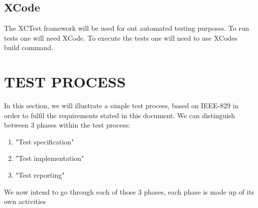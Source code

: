 \documentclass[12pt]{article}
\begin{document}
  \subsection{XCode}
  The XCTest framework will be used for out automated testing purposes. To run tests one will need XCode. To execute the tests one will need to use XCodes build command.
 \section{TEST PROCESS}
In this section, we will illustrate a simple test process, based on IEEE-829 in order to fulfil the requirements stated in this document. \newline\newline
We can distinguish between 3 phases within the test process: \newline
\begin{enumerate}
	\item "Test specification"
	\item "Test implementation"  
	\item "Test reporting" 	
\end{enumerate}
We now intend to go through each of those 3 phases, each phase is made up of its own activities \newline
\end{document}
